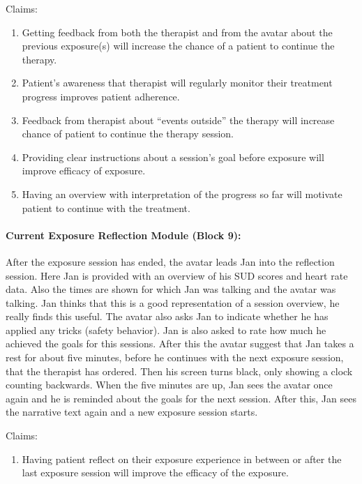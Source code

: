 \newline
Claims:
\begin{enumerate}
\item Getting feedback from both the therapist and from the avatar about the previous exposure(s) will increase the chance of a patient to continue the therapy.
\item Patient’s awareness that therapist will regularly monitor their treatment progress improves patient adherence. 
\item Feedback from therapist about “events outside” the therapy will increase chance of patient to continue the therapy session.
\item Providing clear instructions about a session’s goal before exposure will improve efficacy of exposure.
\item Having an overview with interpretation of the progress so far will motivate patient to continue with the treatment.
\end{enumerate}
\paragraph{Current Exposure Reflection Module (Block 9):}

After the exposure session has ended, the avatar leads Jan into the reflection session. Here Jan is provided with an overview of his SUD scores and heart rate data. Also the times are shown for which Jan was talking and the avatar was talking. Jan thinks that this is a good representation of a session overview, he really finds this useful. \newline
The avatar also asks Jan to indicate whether he has applied any tricks (safety behavior). Jan is also asked to rate how much he achieved the goals for this sessions. \newline
After this the avatar suggest that Jan takes a rest for about five minutes, before he continues with the next exposure session, that the therapist has ordered. Then his screen turns black, only showing a clock counting backwards. When the five minutes are up, Jan sees the avatar once again and he is reminded about the goals for the next session. After this, Jan sees the narrative text again and a new exposure session starts. \newline

Claims: 
\begin{enumerate}
\item Having patient reflect on their exposure experience in between or after the last exposure session will improve the efficacy of the exposure.
\end{enumerate}


